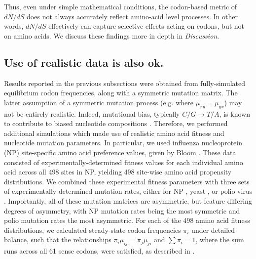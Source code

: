 \documentclass[11pt]{article}
\begin{document}
Thus, even under simple mathematical conditions, the codon-based metric of $dN/dS$ does not always accurately reflect amino-acid level processes. In other words, $dN/dS$ effectively can capture selective effects acting on codons, but not on amino acids. We discuss these findings more in depth in \textit{Discussion}.


\subsection*{Use of realistic data is also ok.}

Results reported in the previous subsections were obtained from fully-simulated equilibrium codon frequencies, along with a symmetric mutation matrix. The latter assumption of a symmetric mutation process (e.g. where $\mu_{xy} = \mu_{yx}$) may not be entirely realistic. Indeed, mutational bias, typically $C/G \rightarrow T/A$, is known to contribute to biased nucleotide compositions \cite{Hernandez2007,HershbergPetrov2010,Zhu2014,Acevedo2014}. Therefore, we performed additional simulations which made use of realistic amino acid fitness and nucleotide mutation parameters.
 In particular, we used influenza nucleoprotein (NP) site-specific amino acid preference values, given by Bloom \cite{Bloom2014a}. These data consisted of experimentally-determined fitness values for each individual amino acid across all 498 sites in NP, yielding 498 site-wise amino acid propensity distributions. We combined these experimental fitness parameters with three sets of experimentally determined mutation rates, either for NP \cite{Bloom2014a}, yeast \cite{Zhu2014}, or polio virus \cite{Acevedo2014}. Importantly, all of these mutation matrices are asymmetric, but feature differing degrees of asymmetry, with NP mutation rates being the most symmetric and polio mutation rates the most asymmetric. For each of the 498 amino acid fitness distributions, we calculated steady-state codon frequencies $\pi_i$ under detailed balance, such that the relationships $\pi_i\mu_{ij} = \pi_j\mu_{ji}$ and $\sum\pi_i = 1$, where the sum runs across all 61 sense codons, were satisfied, as described in \cite{Bloom2014a,Bloom2014b}.
\end{document}
